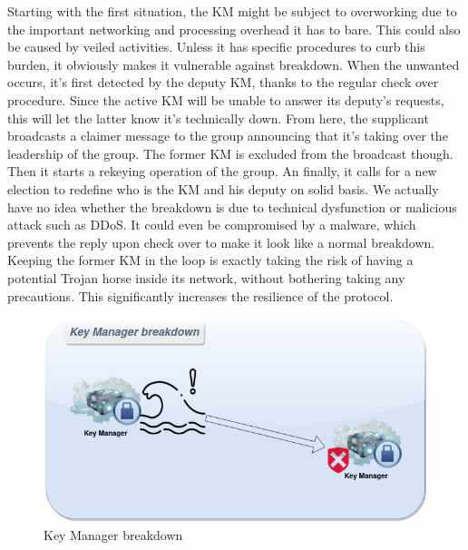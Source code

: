 Starting with the first situation, the KM might be subject to overworking due to the important networking and processing overhead it has to bare. This could also be caused by veiled activities. Unless it has specific procedures to curb this burden, it obviously makes it vulnerable against breakdown. When the unwanted occurs, it’s first detected by the deputy KM, thanks to the regular check over procedure. Since the active KM will be unable to answer its deputy’s requests, this will let the latter know it’s technically down. From here, the supplicant broadcasts a claimer message to the group announcing that it’s taking over the leadership of the group. The former KM is excluded from the broadcast though. Then it starts a rekeying operation of the group. An finally, it calls for a new election to redefine who is the KM and his deputy on solid basis. We actually have no idea whether the breakdown is due to technical dysfunction or malicious attack such as DDoS. It could even be compromised by a malware, which prevents the reply upon check over to make it look like a normal breakdown. Keeping the former KM in the loop is exactly taking the risk of having a potential Trojan horse inside its network, without bothering taking any precautions. This significantly increases the resilience of the protocol.

\begin{figure}[htbp]
	\centerline{\includegraphics[scale=0.50]{figures/flooding.png}}
	\caption{Key Manager breakdown}
	\label{fig:km_breakdown}
\end{figure}

